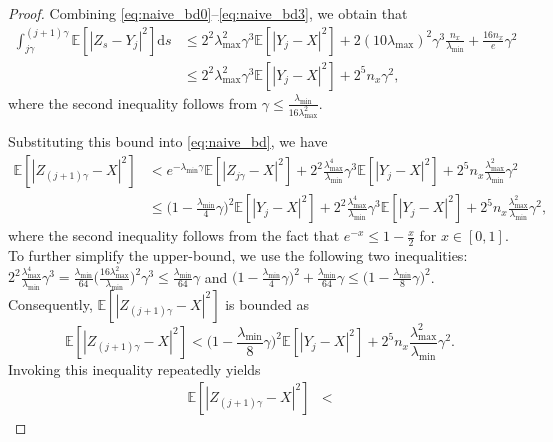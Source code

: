 \documentclass[11pt]{article}
\theoremstyle{plain}
\theoremstyle{definition}
\theoremstyle{remark}
\begin{document}
\begin{proof}
Combining \eqref{eq:naive_bd0}--\eqref{eq:naive_bd3}, we obtain that 
\begin{equation}\nonumber
\begin{split}
\int_{j\gamma}^{(j+1)\gamma} \mathbb{E} [
| Z_s - Y_j |^2
]\mathrm{d} s &\leq 
2^2 \lambda_{\max}^2 \gamma^3 \mathbb{E} [ | Y_j - X |^2 ] + 2(10 \lambda_{\max})^2 \gamma^3 \frac{n_x}{\lambda_{\min}} +  \frac{16n_x}{e}\gamma^2\\
&\leq 2^2 \lambda_{\max}^2 \gamma^3 \mathbb{E} [ | Y_j - X |^2 ] + 2^5 n_x \gamma^2,
\end{split}
\end{equation}
where the second inequality follows from $\gamma \leq \frac{\lambda_{\min}}{16 \lambda_{\max}^2}$. 



Substituting this bound into \eqref{eq:naive_bd}, we have
\begin{equation}\nonumber
\begin{split}
\mathbb{E} [| Z_{(j+1)\gamma} - X |^2 ]  &< e^{-\lambda_{\min}  \gamma} \mathbb{E} [ | Z_{j\gamma} - X |^2]
+2^2\frac{\lambda_{\max}^4}{\lambda_{\min}} \gamma^3 \mathbb{E} [ | Y_j - X |^2 ]
+ 2^5 n_x \frac{\lambda_{\max}^2}{\lambda_{\min}} \gamma^2\\
&\leq  \bigg (
1 - \frac{\lambda_{\min} }{4}\gamma
\bigg )^2 \mathbb{E} [ | Y_j - X|^2]+2^2\frac{\lambda_{\max}^4}{\lambda_{\min}} \gamma^3 \mathbb{E} [ | Y_j - X |^2 ]
+ 2^5 n_x \frac{\lambda_{\max}^2}{\lambda_{\min} } \gamma^2,
\end{split}
\end{equation}
where the second inequality follows from the fact that 
$e^{-x} \leq 1 - \frac{x}{2}$ for $x \in [0,1]$. 
To further simplify the upper-bound, we use the following  two inequalities: 
$2^2\frac{\lambda_{\max}^4}{\lambda_{\min}} \gamma^3 = \frac{\lambda_{\min}}{64 } \big (\frac{16 \lambda_{\max}^2}{\lambda_{\min}}\big )^2\gamma^3 
\leq \frac{\lambda_{\min}}{64 }  \gamma$ and 
$\big (
1 - \frac{\lambda_{\min}}{4}\gamma
\big )^2 + \frac{\lambda_{\min}}{64}  \gamma \leq \big (
1 - \frac{\lambda_{\min}}{8}\gamma
\big )^2$.
Consequently, $\mathbb{E} [| Z_{(j+1)\gamma} - X |^2 ]$ is bounded as
\[
\mathbb{E} [| Z_{(j+1)\gamma} - X |^2 ] < \bigg (
1 - \frac{\lambda_{\min} }{8}\gamma
\bigg )^2\mathbb{E} [ | Y_j - X|^2]  + 2^5 n_x \frac{\lambda_{\max} ^2}{\lambda_{\min} } \gamma^2.
\]
Invoking this inequality repeatedly yields
\begin{equation}\nonumber
\begin{split}
\mathbb{E} [| Z_{(j+1)\gamma} - X |^2 ] &<

\end{split}
\end{equation}
\end{proof}
\end{document}
